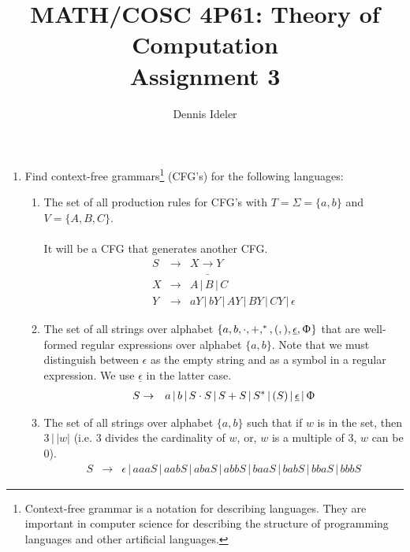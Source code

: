 \documentclass[10pt,a4paper,final]{article}
\author{Dennis Ideler}
\title{MATH/COSC 4P61: Theory of Computation\\Assignment 3}
\begin{document}
\maketitle

\begin{enumerate}
\item %
Find context-free grammars\footnote{Context-free grammar is a notation for describing languages.
They are important in computer science for describing the structure of programming languages and other artificial languages.}
(CFG's) for the following languages:
\begin{enumerate}
  \item %
  The set of all production rules for CFG's with $T = \Sigma = \{a,b\}$ and $V = \{A,B,C\}$. \\
  \\
  It will be a CFG that generates another CFG.
  \begin{eqnarray*}
  S &\rightarrow& X \underline{\rightarrow} Y \\
  X &\rightarrow& A \,|\, B \,|\, C \\
  Y &\rightarrow& aY \,|\, bY \,|\, AY \,|\, BY \,|\, CY \,|\, \epsilon
  \end{eqnarray*}
  
  \item %
  The set of all strings over alphabet $\{a,b,\cdot,+,^*,(,),\underline{\epsilon},\Upphi\}$
  that are well-formed regular expressions over alphabet $\{a,b\}$. Note that we must distinguish
  between $\epsilon$ as the empty string and as a symbol in a regular expression. We use
  $\underline{\epsilon}$ in the latter case.
  \begin{eqnarray*}
  S &\rightarrow& a \,|\, b \,|\, S \cdot S \,|\, S + S \,|\, S^* \,|\, (S) \,|\,
   \underline{\epsilon} \,|\, \Upphi
  \end{eqnarray*}
  
  \item %
  The set of all strings over alphabet $\{a,b\}$ such that if $w$ is in the set, then $3\,|\,|w|$
  (i.e. 3 divides the cardinality of $w$, or, $w$ is a multiple of 3, $w$ can be 0).
  \begin{eqnarray*}
  S &\rightarrow& \epsilon \,|\, aaaS \,|\, aabS \,|\, abaS \,|\, abbS \,|\, baaS \,|\, babS \,|\,
   bbaS \,|\, bbbS
  \end{eqnarray*}
  

\end{enumerate}
\end{enumerate}
\end{document}
